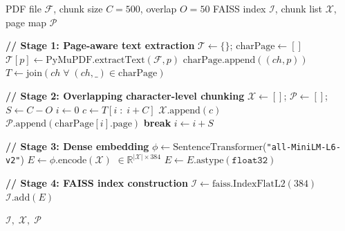 \documentclass[conference]{IEEEtran}
\begin{document}
\begin{algorithm}[t]
\caption{DocMind AI — Document Indexing Pipeline}
\label{alg:index}
\begin{algorithmic}[1]
\renewcommand{\algorithmicrequire}{\textbf{Input:}}
\renewcommand{\algorithmicensure}{\textbf{Output:}}
\REQUIRE PDF file $\mathcal{F}$, chunk size $C=500$, overlap $O=50$
\ENSURE  FAISS index $\mathcal{I}$, chunk list $\mathcal{X}$,
         page map $\mathcal{P}$

\STATE \textbf{// Stage 1: Page-aware text extraction}
\STATE $\mathcal{T} \leftarrow \{\}$; $\mathrm{charPage} \leftarrow []$
  \STATE $\mathcal{T}[p] \leftarrow \mathrm{PyMuPDF.extractText}(\mathcal{F}, p)$
    \STATE $\mathrm{charPage}.\mathrm{append}((ch, p))$
  \ENDFOR
\ENDFOR
\STATE $T \leftarrow \mathrm{join}(ch \;\forall\; (ch,\_) \in \mathrm{charPage})$

\STATE \textbf{// Stage 2: Overlapping character-level chunking}
\STATE $\mathcal{X} \leftarrow []$; $\mathcal{P} \leftarrow []$;
       $S \leftarrow C - O$
\STATE $i \leftarrow 0$
  \STATE $c \leftarrow T[i \;:\; i+C]$
    \STATE $\mathcal{X}.\mathrm{append}(c)$
    \STATE $\mathcal{P}.\mathrm{append}(\mathrm{charPage}[i].\mathrm{page})$
  \ENDIF
   \textbf{break} \ENDIF
  \STATE $i \leftarrow i + S$
\ENDWHILE

\STATE \textbf{// Stage 3: Dense embedding}
\STATE $\phi \leftarrow \mathrm{SentenceTransformer}$(\texttt{"all-MiniLM-L6-v2"})
\STATE $E \leftarrow \phi.\mathrm{encode}(\mathcal{X})$
       $\in \mathbb{R}^{|\mathcal{X}| \times 384}$
\STATE $E \leftarrow E.\mathrm{astype}(\texttt{float32})$

\STATE \textbf{// Stage 4: FAISS index construction}
\STATE $\mathcal{I} \leftarrow \mathrm{faiss.IndexFlatL2}(384)$
\STATE $\mathcal{I}.\mathrm{add}(E)$

\RETURN $\mathcal{I},\; \mathcal{X},\; \mathcal{P}$
\end{algorithmic}
\end{algorithm}
\end{document}
